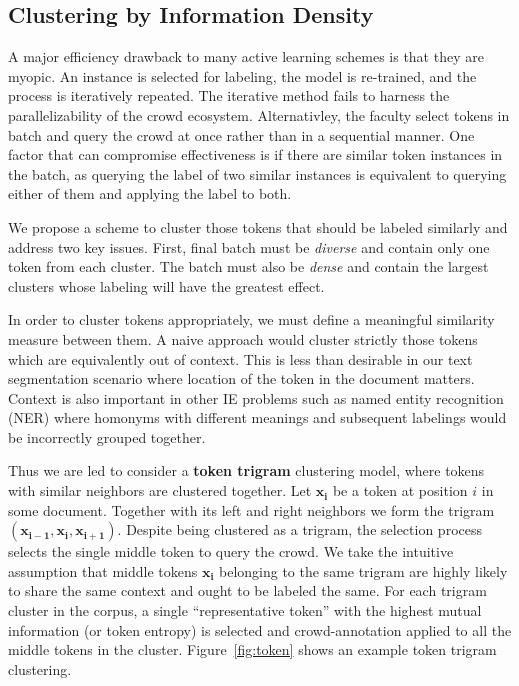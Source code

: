 \subsection{Clustering by Information Density}

A major efficiency drawback to many active learning schemes is that they are myopic. An instance is selected
for labeling, the model is re-trained, and the process is iteratively repeated. The iterative method fails to harness the parallelizability of the crowd ecosystem. Alternativley, the faculty select tokens in batch and query the crowd at once rather than in a sequential manner. One factor that can compromise effectiveness is if there are similar token instances in the batch, as querying the label of two similar instances is equivalent to querying either of them and applying the label to both. 

We propose a scheme to cluster those tokens that should be labeled similarly and address two key issues. First, final batch must be \textit{diverse} and contain only one token from each cluster. The batch must also be \textit{dense} and contain the largest clusters whose labeling will have the greatest effect.  

In order to cluster tokens appropriately, we must define a meaningful similarity measure between them. A naive approach would cluster strictly those tokens which are equivalently out of context. This is less than desirable in our text segmentation scenario where location of the token in the document matters. Context is also important in other IE problems such as named entity recognition (NER) where homonyms with different meanings and subsequent labelings would be incorrectly grouped together.

Thus we are led to consider a \textbf{token trigram} clustering model, where tokens with similar neighbors are clustered together. Let $\mathbf{x_{i}}$ be a token at position $i$ in some document.  Together with its left and right neighbors we form the trigram $(\mathbf{x_{i-1}},\mathbf{x_{i}},\mathbf{x_{i+1}})$.  Despite being clustered as a trigram, the selection process selects the single middle token to query the crowd. We take the intuitive assumption that middle tokens $\mathbf{x_{i}}$ belonging to the same trigram are highly likely to share the same context and ought to be labeled the same. For each trigram cluster in the corpus, a single ``representative token'' with the highest mutual information (or token entropy) is selected and crowd-annotation applied to all the middle tokens in the cluster. Figure~\ref{fig:token} shows an example token trigram clustering.  

